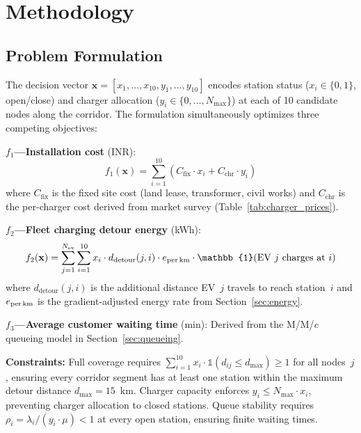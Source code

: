 \documentclass[conference]{IEEEtran}
\begin{document}
\section{Methodology}
\label{sec:method}

\subsection{Problem Formulation}
\label{sec:formulation}

The decision vector $\mathbf{x} = [x_1, \ldots, x_{10}, y_1, \ldots, y_{10}]$ encodes station status ($x_i \in \{0,1\}$, open/close) and charger allocation ($y_i \in \{0, \ldots, N_{\max}\}$) at each of 10 candidate nodes along the corridor. The formulation simultaneously optimizes three competing objectives:

\textbf{$f_1$---Installation cost} (INR):
\begin{equation}
f_1(\mathbf{x}) = \sum_{i=1}^{10} \left( C_{\text{fix}} \cdot x_i + C_{\text{chr}} \cdot y_i \right)
\label{eq:cost}
\end{equation}
\noindent where $C_{\text{fix}}$ is the fixed site cost (land lease, transformer, civil works) and $C_{\text{chr}}$ is the per-charger cost derived from market survey (Table~\ref{tab:charger_prices}).

\textbf{$f_2$---Fleet charging detour energy} (kWh):
\begin{equation}
f_2(\mathbf{x}) = \sum_{j=1}^{N_{\text{ev}}} \sum_{i=1}^{10} x_i \cdot d_{\text{detour}}(j,i) \cdot e_{\text{per\,km}} \cdot \mathbb{1}(\text{EV } j \text{ charges at } i)
\label{eq:energy}
\end{equation}
\noindent where $d_{\text{detour}}(j,i)$ is the additional distance EV~$j$ travels to reach station~$i$ and $e_{\text{per\,km}}$ is the gradient-adjusted energy rate from Section~\ref{sec:energy}.

\textbf{$f_3$---Average customer waiting time} (min): Derived from the M/M/$c$ queueing model in Section~\ref{sec:queueing}.

\textbf{Constraints:} Full coverage requires $\sum_{i=1}^{10} x_i \cdot \mathbb{1}(d_{ij} \leq d_{\max}) \geq 1$ for all nodes~$j$, ensuring every corridor segment has at least one station within the maximum detour distance $d_{\max} = 15$~km. Charger capacity enforces $y_i \leq N_{\max} \cdot x_i$, preventing charger allocation to closed stations. Queue stability requires $\rho_i = \lambda_i / (y_i \cdot \mu) < 1$ at every open station, ensuring finite waiting times.
\end{document}
